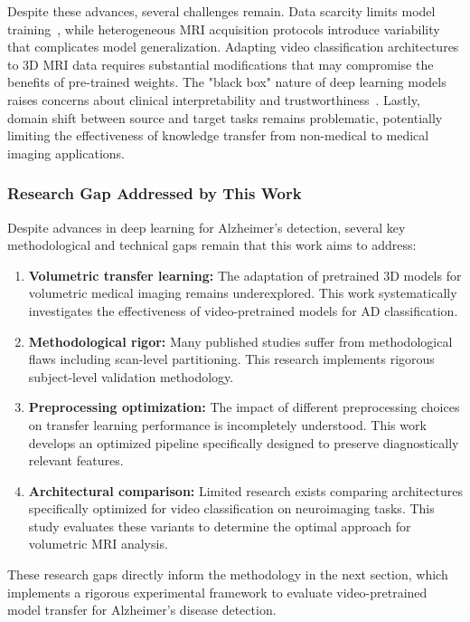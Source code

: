 \documentclass[12pt, a4paper]{article}
\begin{document}
Despite these advances, several challenges remain. Data scarcity limits model training~\cite{pradhan2024analysis}, while heterogeneous MRI acquisition protocols introduce variability that complicates model generalization. Adapting video classification architectures to 3D MRI data requires substantial modifications that may compromise the benefits of pre-trained weights. The "black box" nature of deep learning models raises concerns about clinical interpretability and trustworthiness~\cite{basaia2019automated}. Lastly, domain shift between source and target tasks remains problematic, potentially limiting the effectiveness of knowledge transfer from non-medical to medical imaging applications.

\subsubsection{Research Gap Addressed by This Work}

Despite advances in deep learning for Alzheimer's detection, several key methodological and technical gaps remain that this work aims to address:

\begin{enumerate}
\item \textbf{Volumetric transfer learning:} The adaptation of pretrained 3D models for volumetric medical imaging remains underexplored. This work systematically investigates the effectiveness of video-pretrained models for AD classification.

\item \textbf{Methodological rigor:} Many published studies suffer from methodological flaws including scan-level partitioning. This research implements rigorous subject-level validation methodology.

\item \textbf{Preprocessing optimization:} The impact of different preprocessing choices on transfer learning performance is incompletely understood. This work develops an optimized pipeline specifically designed to preserve diagnostically relevant features.

\item \textbf{Architectural comparison:} Limited research exists comparing architectures specifically optimized for video classification on neuroimaging tasks. This study evaluates these variants to determine the optimal approach for volumetric MRI analysis.
\end{enumerate}

These research gaps directly inform the methodology in the next section, which implements a rigorous experimental framework to evaluate video-pretrained model transfer for Alzheimer's disease detection.
\end{document}

